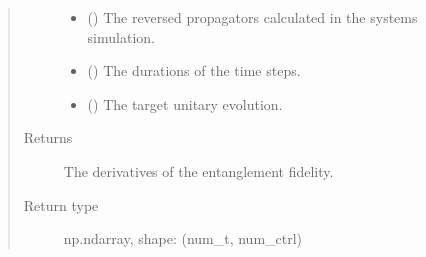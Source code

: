 \documentclass[letterpaper,10pt,english]{sphinxmanual}
\begin{document}
\begin{fulllineitems}
\begin{quote}
\begin{description}
\begin{itemize}
\item {} 
 (\sphinxstyleliteralemphasis{\sphinxupquote{{[}}}\sphinxstyleliteralemphasis{\sphinxupquote{{]}}}) \textendash{} The reversed propagators calculated in the systems simulation.

\item {} 
 (\sphinxstyleliteralemphasis{\sphinxupquote{{[}}}\sphinxstyleliteralemphasis{\sphinxupquote{{]}}}\sphinxstyleliteralemphasis{\sphinxupquote{, }}) \textendash{} The durations of the time steps.

\item {} 
 () \textendash{} The target unitary evolution.

\end{itemize}

\item[{Returns}] \leavevmode
{} \textendash{} The derivatives of the entanglement fidelity.

\item[{Return type}] \leavevmode
np.ndarray, shape: (num\_t, num\_ctrl)

\end{description}\end{quote}

\end{fulllineitems}

\end{document}
